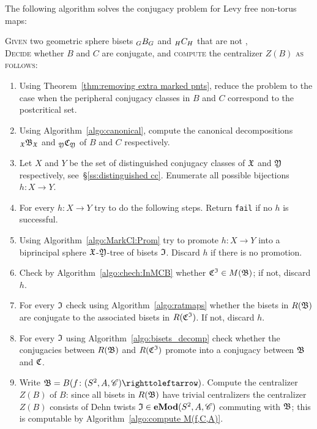 \documentclass{amsart}
\begin{document}
The following algorithm solves the conjugacy problem for Levy free
non-torus maps:
\begin{algo}\label{algo:DecidExp}
  \textsc{Given} two geometric sphere bisets $\subscript {G}B_{G}$ and  $\subscript {H}C_{H}$ that are not \Tor,\\
  \textsc{Decide} whether $B$ and $C$ are conjugate, and \textsc{compute} the centralizer $Z(B)$ \textsc{as
    follows:}\\\upshape
 \begin{enumerate}
 \item Using Theorem~\ref{thm:removing extra marked pnts}, reduce the problem to the case when the peripheral conjugacy classes in $B$ and $C$ correspond to the postcritical set.
 \item Using Algorithm~\ref{algo:canonical}, compute the canonical 
   decompositions $\subscript \gf\gfB_\gf$ and
   $\subscript \gfY\gfC_\gfY$ of $B$ and $C$
   respectively.
 \item Let $X$ and $Y$ be the set of distinguished conjugacy classes
   of $\gf$ and $\gfY$ respectively, see~\S\ref{ss:distinguished
     cc}. Enumerate all possible bijections $h\colon X\to Y$.
 \item For every $h\colon X\to Y$ try to do the following
   steps. Return \texttt{fail} if no $h$ is successful.
 \item Using Algorithm~\ref{algo:MarkCl:Prom} try to promote
   $h\colon X\to Y$ into a biprincipal sphere $\gf$-$\gfY$-tree of
   bisets $\gfI$. Discard $h$ if there is no promotion.
 \item Check by Algorithm~\ref{algo:chech:InMCB} whether
   $\gfC^\gfI \in M(\gfB)$; if not, discard
   $h$.
 \item For every $\gfI$ check using Algorithm~\ref{algo:ratmaps}
   whether the bisets in $R(\gfB)$ are conjugate to the associated
   bisets in $R(\gfC^\gfI)$. If not, discard $h$.
 \item For every $\gfI$ using Algorithm~\ref{algo:bisets_decomp}
   check whether the conjugacies between $R(\gfB)$ and
   $R(\gfC^\gfI)$ promote into a conjugacy between
   $\gfB$ and $\gfC$. 
 \item Write $\gfB=B(f\colon (S^2,A,\CC)\selfmap)$. Compute the
   centralizer $Z(B)$ of $B$: since all bisets in $R(\gfB)$ have
   trivial centralizers the centralizer $Z(B)$ consists of Dehn twists
   $\gfI\in \Mod[e](S^2,A,\CC)$ commuting with $\gfB$; this is
   computable by Algorithm~\ref{algo:compute M(f,C,A)}.
 \end{enumerate}
\end{algo}
\end{document}
